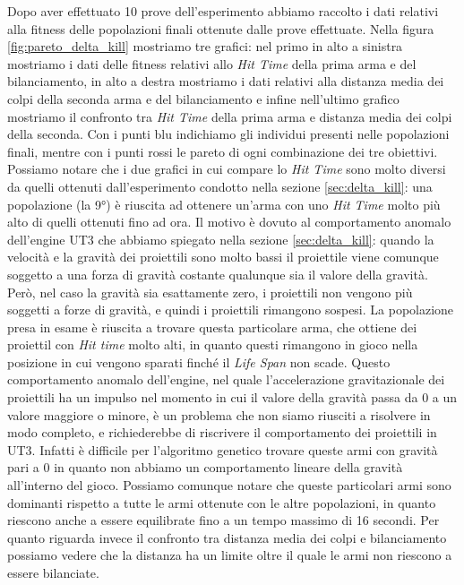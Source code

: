 \documentclass[12pt, italian]{toptesi}
\begin{document}
Dopo aver effettuato 10 prove dell'esperimento abbiamo raccolto i dati relativi alla fitness delle popolazioni finali ottenute dalle prove effettuate.
Nella figura \ref{fig:pareto_delta_kill} mostriamo tre grafici: nel primo in alto a sinistra mostriamo i dati delle fitness relativi allo \emph{Hit Time} della prima arma e del bilanciamento, in alto a destra mostriamo i dati relativi alla distanza media dei colpi della seconda arma e del bilanciamento e infine nell'ultimo grafico mostriamo il confronto tra \emph{Hit Time} della prima arma e distanza media dei colpi della seconda. Con i punti blu indichiamo gli individui presenti nelle popolazioni finali, mentre con i punti rossi le pareto di ogni combinazione dei tre obiettivi.
Possiamo notare che i due grafici in cui compare lo \emph{Hit Time} sono molto diversi da quelli ottenuti dall'esperimento condotto nella sezione \ref{sec:delta_kill}: una popolazione (la 9°) è riuscita ad ottenere un'arma con uno \emph{Hit Time} molto più alto di quelli ottenuti fino ad ora.
Il motivo è dovuto al comportamento anomalo dell'engine UT3 che abbiamo spiegato nella sezione \ref{sec:delta_kill}: quando la velocità e la gravità dei proiettili sono molto bassi il proiettile viene comunque soggetto a una forza di gravità costante qualunque sia il valore della gravità. Però, nel caso la gravità sia esattamente zero, i proiettili non vengono più soggetti a forze di gravità, e quindi i proiettili rimangono sospesi. La popolazione presa in esame è riuscita a trovare questa particolare arma, che ottiene dei proiettil con \emph{Hit time} molto alti, in quanto questi rimangono in gioco nella posizione in cui vengono sparati finché il \emph{Life Span} non scade.
Questo comportamento anomalo dell'engine, nel quale l'accelerazione gravitazionale dei proiettili ha un impulso nel momento in cui il valore della gravità passa da 0 a un valore maggiore o minore, è un problema che non siamo riusciti a risolvere in modo completo, e richiederebbe di riscrivere il comportamento dei proiettili in UT3. Infatti è difficile per l'algoritmo genetico trovare queste armi con gravità pari a 0 in quanto non abbiamo un comportamento lineare della gravità all'interno del gioco.
Possiamo comunque notare che queste particolari armi sono dominanti rispetto a tutte le armi ottenute con le altre popolazioni, in quanto riescono anche a essere equilibrate fino a un tempo massimo di 16 secondi. 
Per quanto riguarda invece il confronto tra distanza media dei colpi e bilanciamento possiamo vedere che la distanza ha un limite oltre il quale le armi non riescono a essere bilanciate.
\end{document}
